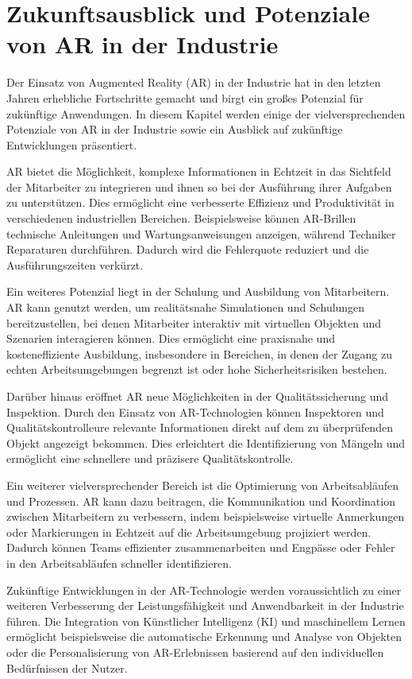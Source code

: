 \section{Zukunftsausblick und Potenziale von AR in der Industrie}

Der Einsatz von Augmented Reality (AR) in der Industrie hat in den letzten
Jahren erhebliche Fortschritte gemacht und birgt ein großes Potenzial für
zukünftige Anwendungen. In diesem Kapitel werden einige der vielversprechenden
Potenziale von AR in der Industrie sowie ein Ausblick auf zukünftige
Entwicklungen präsentiert.

AR bietet die Möglichkeit, komplexe Informationen in Echtzeit in das Sichtfeld
der Mitarbeiter zu integrieren und ihnen so bei der Ausführung ihrer Aufgaben
zu unterstützen. Dies ermöglicht eine verbesserte Effizienz und Produktivität
in verschiedenen industriellen Bereichen. Beispielsweise können AR-Brillen
technische Anleitungen und Wartungsanweisungen anzeigen, während Techniker
Reparaturen durchführen. Dadurch wird die Fehlerquote reduziert und die
Ausführungszeiten verkürzt.

Ein weiteres Potenzial liegt in der Schulung und Ausbildung von Mitarbeitern.
AR kann genutzt werden, um realitätsnahe Simulationen und Schulungen
bereitzustellen, bei denen Mitarbeiter interaktiv mit virtuellen Objekten und
Szenarien interagieren können. Dies ermöglicht eine praxisnahe und
kosteneffiziente Ausbildung, insbesondere in Bereichen, in denen der Zugang zu
echten Arbeitsumgebungen begrenzt ist oder hohe Sicherheitsrisiken bestehen.

Darüber hinaus eröffnet AR neue Möglichkeiten in der Qualitätssicherung und
Inspektion. Durch den Einsatz von AR-Technologien können Inspektoren und
Qualitätskontrolleure relevante Informationen direkt auf dem zu überprüfenden
Objekt angezeigt bekommen. Dies erleichtert die Identifizierung von Mängeln und
ermöglicht eine schnellere und präzisere Qualitätskontrolle.

Ein weiterer vielversprechender Bereich ist die Optimierung von Arbeitsabläufen
und Prozessen. AR kann dazu beitragen, die Kommunikation und Koordination
zwischen Mitarbeitern zu verbessern, indem beispielsweise virtuelle Anmerkungen
oder Markierungen in Echtzeit auf die Arbeitsumgebung projiziert werden.
Dadurch können Teams effizienter zusammenarbeiten und Engpässe oder Fehler in
den Arbeitsabläufen schneller identifizieren.

Zukünftige Entwicklungen in der AR-Technologie werden voraussichtlich zu einer
weiteren Verbesserung der Leistungsfähigkeit und Anwendbarkeit in der Industrie
führen. Die Integration von Künstlicher Intelligenz (KI) und maschinellem
Lernen ermöglicht beispielsweise die automatische Erkennung und Analyse von
Objekten oder die Personalisierung von AR-Erlebnissen basierend auf den
individuellen Bedürfnissen der Nutzer.

